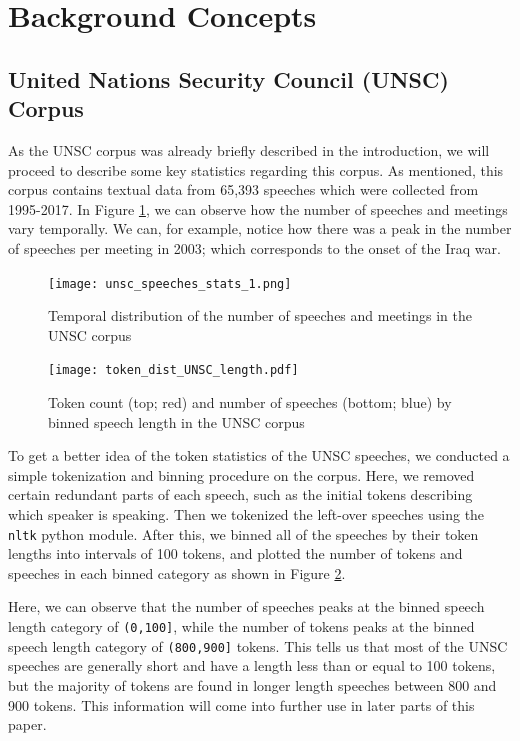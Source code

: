 \section{Background Concepts}
\label{background}

\subsection{United Nations Security Council (UNSC) Corpus}
As the UNSC corpus was already briefly described in the introduction, we will proceed to describe some key statistics regarding this corpus. As mentioned, this corpus contains textual data from 65,393 speeches which were collected from 1995-2017. In Figure \ref{UNSC_stats_1}, we can observe how the number of speeches and meetings vary temporally. We can, for example, notice how there was a peak in the number of speeches per meeting in 2003; which corresponds to the onset of the Iraq war.

\begin{figure}[H]
    \centering
    \texttt{[image: unsc\_speeches\_stats\_1.png]}
    \caption{Temporal distribution of the number of speeches and meetings in the UNSC corpus \citep{schnfeld2019security}}
    \label{UNSC_stats_1}
\end{figure}

\begin{figure}[t]
    \centering
    \texttt{[image: token\_dist\_UNSC\_length.pdf]}
    \caption{Token count (top; red) and number of speeches (bottom; blue) by binned speech length in the UNSC corpus}
    \label{UNSC_stats_2}
\end{figure}

To get a better idea of the token statistics of the UNSC speeches, we conducted a simple tokenization and binning procedure on the corpus. Here, we removed certain redundant parts of each speech, such as the initial tokens describing which speaker is speaking. Then we tokenized the left-over speeches using the \texttt{nltk} python module. After this, we binned all of the speeches by their token lengths into intervals of 100 tokens, and plotted the number of tokens and speeches in each binned category as shown in Figure \ref{UNSC_stats_2}.

Here, we can observe that the number of speeches peaks at the binned speech length category of \texttt{(0,100]}, while the number of tokens peaks at the binned speech length category of \texttt{(800,900]} tokens. This tells us that most of the UNSC speeches are generally short and have a length less than or equal to 100 tokens, but the majority of tokens are found in longer length speeches between 800 and 900 tokens. This information will come into further use in later parts of this paper.


